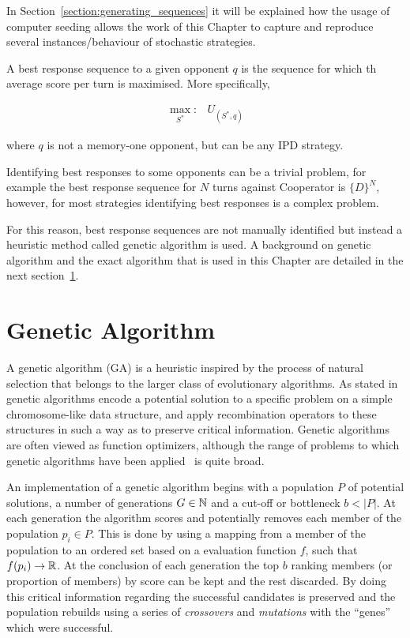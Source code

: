 In Section~\ref{section:generating_sequences} it will be explained how the usage
of computer seeding allows the work of this Chapter to capture and reproduce
several instances/behaviour of stochastic strategies.

A best response sequence to a given opponent \(q\) is the sequence for which th
average score per turn is maximised. More specifically,

\begin{equation}\label{eq:best_response}
    \begin{aligned}
    \max_{S^*}: & U_{(S^*, q)}
    \end{aligned}
\end{equation}

where \(q\) is not a memory-one opponent, but can be any IPD strategy.

Identifying best responses to some opponents can be a trivial problem, for
example the best response sequence for \(N\) turns against Cooperator is
\(\{D\}^N\), however, for most strategies identifying best responses is a
complex problem.

For this reason, best response sequences are not manually identified but instead
a heuristic method called genetic algorithm is used. A background on genetic
algorithm and the exact algorithm that is used in this Chapter are detailed in
the next section~\ref{section:genetic_algorithm}.

\section{Genetic Algorithm}\label{section:genetic_algorithm}

A genetic algorithm (GA) is a heuristic inspired by the process of natural
selection that belongs to the larger class of evolutionary algorithms. As stated
in~\cite{Whitley1994} genetic algorithms encode a potential solution to a
specific problem on a simple chromosome-like data structure, and apply
recombination operators to these structures in such a way as to preserve
critical information. Genetic algorithms are often viewed as function
optimizers, although the range of problems to which genetic algorithms have been
applied~\cite{Hou1994, Jones1997, Yang1998} is quite broad.

An implementation of a genetic algorithm begins with a population \(P\) of
potential solutions, a number of generations \(G \in \mathbb{N}\) and a cut-off or
bottleneck \(b < |P|\). At each generation the algorithm scores and potentially
removes each member of the population \(p_i \in P\). This is done by using a
mapping from a member of the population to an ordered set based on a evaluation
function \(f\), such that \(f(p_i) \to \mathbb{R}\). At the conclusion of each
generation the top \(b\) ranking members (or proportion of members) by score can
be kept and the rest discarded.  By doing this critical information regarding
the successful candidates is preserved and the population rebuilds using a
series of \textit{crossovers} and \textit{mutations} with the ``genes'' which
were successful.

